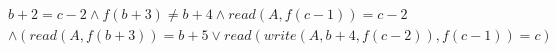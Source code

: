 \begin{align*}
%
& %
b + 2 = c - 2
%
\land
%
f(b + 3)  \neq  b + 4
%
\land
%
\mathit{read}(A,f(c - 1)) = c - 2
~\\~
& %
%
\land
%
(\mathit{read}(A,f(b + 3)) = b + 5 \lor \mathit{read}(\mathit{write}(A,b + 4,f(c - 2)),f(c - 1)) = c)
%
\end{align*}

